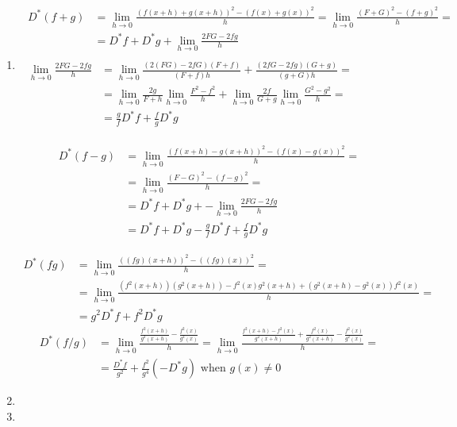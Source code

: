 \documentclass[twoside]{amsart}
\theoremstyle{plain}
\theoremstyle{definition}
\newcommand{\exercisehead}[1]
  {\smallskip
   \noindent{\small\bf Exercise #1.}}
\begin{document}
\exercisehead{16} \begin{enumerate}
\item
\[
\begin{gathered}
\begin{aligned}
  D^* (f+g) & = \lim_{h\to 0} \frac{ (f(x+h) + g(x+h))^2 - (f(x) +g(x))^2 }{ h } = \lim_{h\to 0} \frac{ (F+G)^2 - (f+g)^2 }{ h } = \\
  & = D^* f + D^* g + \lim_{h \to 0} \frac{ 2FG - 2fg}{ h} 
\end{aligned} \\
\begin{aligned}
  \lim_{h \to 0} \frac{ 2FG - 2fg}{h} & = \lim_{h \to 0} \frac{ (2(FG) - 2fG )(F+f) }{ (F+f) h } + \frac{ (2fG - 2fg)(G+g)}{ (g+G)h } = \\
  & =   \lim_{h \to 0}  \frac{2g}{F+h} \lim_{h \to 0}  \frac{ F^2 - f^2}{h} + \lim_{h \to 0}  \frac{2f }{ G+g} \lim_{h \to 0}  \frac{ G^2 - g^2}{h} = \\
  & = \frac{g}{f} D^* f + \frac{f}{g} D^* g 
\end{aligned}
\end{gathered}
\]

\[
\begin{aligned}
  D^* (f-g) &= \lim_{h\to 0} \frac{ (f(x+h) - g(x+h))^2 - (f(x) -g(x))^2 }{ h } = \\ 
  & = \lim_{h\to 0} \frac{ (F-G)^2 - (f-g)^2 }{ h } = \\
  & = D^* f + D^* g + -\lim_{h \to 0} \frac{ 2FG - 2fg}{ h} \\
  & = D^*f + D^*g - \frac{g}{f}D^*f + \frac{f}{g}D^* g
\end{aligned} 
\]

\[
\begin{aligned}
  D^* (fg) & = \lim_{h \to 0} \frac{ ((fg)(x+h))^2 - ((fg)(x))^2 }{ h } = \\
  & = \lim_{h\to 0 } \frac{ (f^2 (x+h))(g^2(x+h)) -f^2(x) g^2(x+h) + (g^2(x+h) - g^2(x))f^2(x) }{ h} = \\
  & = g^2 D^*f + f^2 D^* g   
\end{aligned}
\]
\[
\begin{aligned}
  D^*(f/g) & = \lim_{h\to 0} \frac{ \frac{f^2(x+h)}{g^2(x+h)} - \frac{f^2(x) }{ g^2(x) } }{ h} = 
  \lim_{h\to 0} \frac{ \frac{ f^2(x+h) - f^2(x) }{ g^2(x+h)} + \frac{f^2(x) }{ g^2(x+h) } - \frac{ f^2(x) }{ g^2(x)} }{ h } = \\ 
  & = \frac{ D^* f}{g^2} + \frac{f^2}{g^4} (-D^* g ) \text{ when } g(x) \neq 0
\end{aligned}
\]
\item 
\item
\end{enumerate}
\end{document}
